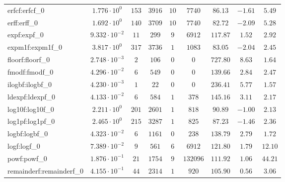 \begin{tabular}{|l|c|c|c|c|c|c|c|c|}
erfcf:erfcf\_0               & $ 1.776 \cdot 10^{0}  $ & $ 153    $ & $ 3916  $ & $ 10  $ & $ 7740   $ & $ 86.13       $ & $ -1.61   $ & $ 5.49    $ \\
erff:erff\_0                 & $ 1.692 \cdot 10^{0}  $ & $ 140    $ & $ 3709  $ & $ 10  $ & $ 7740   $ & $ 82.72       $ & $ -2.09   $ & $ 5.28    $ \\
expf:expf\_0                 & $ 9.332 \cdot 10^{-2} $ & $ 11     $ & $ 299   $ & $ 9   $ & $ 6912   $ & $ 117.87      $ & $ 1.52    $ & $ 2.92    $ \\
expm1f:expm1f\_0             & $ 3.817 \cdot 10^{0}  $ & $ 317    $ & $ 3736  $ & $ 1   $ & $ 1083   $ & $ 83.05       $ & $ -2.04   $ & $ 2.45    $ \\
floorf:floorf\_0             & $ 2.748 \cdot 10^{-3} $ & $ 2      $ & $ 106   $ & $ 0   $ & $ 0      $ & $ 727.80      $ & $ 8.63    $ & $ 1.64    $ \\
fmodf:fmodf\_0               & $ 4.296 \cdot 10^{-2} $ & $ 6      $ & $ 549   $ & $ 0   $ & $ 0      $ & $ 139.66      $ & $ 2.84    $ & $ 2.47    $ \\
ilogbf:ilogbf\_0             & $ 4.230 \cdot 10^{-3} $ & $ 1      $ & $ 22    $ & $ 0   $ & $ 0      $ & $ 236.41      $ & $ 5.77    $ & $ 1.57    $ \\
ldexpf:ldexpf\_0             & $ 4.133 \cdot 10^{-2} $ & $ 6      $ & $ 584   $ & $ 1   $ & $ 378    $ & $ 145.16      $ & $ 3.11    $ & $ 2.17    $ \\
log10f:log10f\_0             & $ 2.211 \cdot 10^{0}  $ & $ 201    $ & $ 2601  $ & $ 1   $ & $ 818    $ & $ 90.89       $ & $ -1.00   $ & $ 2.13    $ \\
log1pf:log1pf\_0             & $ 2.465 \cdot 10^{0}  $ & $ 215    $ & $ 3287  $ & $ 1   $ & $ 825    $ & $ 87.23       $ & $ -1.46   $ & $ 2.36    $ \\
logbf:logbf\_0               & $ 4.323 \cdot 10^{-2} $ & $ 6      $ & $ 1161  $ & $ 0   $ & $ 238    $ & $ 138.79      $ & $ 2.79    $ & $ 1.72    $ \\
logf:logf\_0                 & $ 7.389 \cdot 10^{-2} $ & $ 9      $ & $ 561   $ & $ 6   $ & $ 6912   $ & $ 121.80      $ & $ 1.79    $ & $ 12.10   $ \\
powf:powf\_0                 & $ 1.876 \cdot 10^{-1} $ & $ 21     $ & $ 1754  $ & $ 9   $ & $ 132096 $ & $ 111.92      $ & $ 1.06    $ & $ 44.21   $ \\
remainderf:remainderf\_0     & $ 4.155 \cdot 10^{-1} $ & $ 44     $ & $ 2314  $ & $ 1   $ & $ 920    $ & $ 105.90      $ & $ 0.56    $ & $ 3.06    $ \\

\end{tabular}
